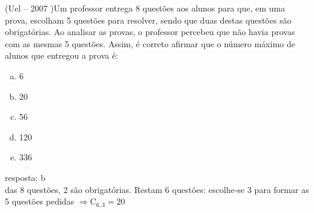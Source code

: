 \begin{ex}
 	(Uel – 2007 )Um professor entrega 8 questões aos alunos para que, em uma prova, escolham 5 questões para resolver, sendo que duas destas questões são obrigatórias. Ao analisar as provas, o professor percebeu que não havia provas com as mesmas 5 questões. Assim, é correto afirmar que o número máximo de alunos que entregou a prova é:
    \begin{enumerate}[(a)]
    \item 6
    \item 20
    \item 56
    \item 120
    \item 336
    \end{enumerate}
      \begin{sol}
      resposta: b \\
      das 8 questões, 2 são obrigatórias. Restam 6 questões: escolhe-se 3 para formar as 5 questões pedidas $\Longrightarrow \mathrm{C}_{6,3}=20$
      \end{sol}
\end{ex}